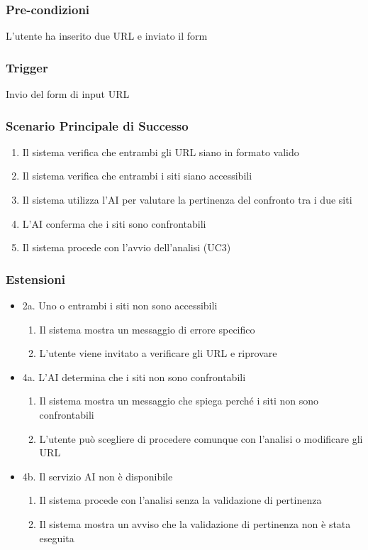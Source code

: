 \subsubsection{Pre-condizioni}
L'utente ha inserito due URL e inviato il form

\subsubsection{Trigger}
Invio del form di input URL

\subsubsection{Scenario Principale di Successo}
\begin{enumerate}
    \item Il sistema verifica che entrambi gli URL siano in formato valido
    \item Il sistema verifica che entrambi i siti siano accessibili
    \item Il sistema utilizza l'AI per valutare la pertinenza del confronto tra i due siti
    \item L'AI conferma che i siti sono confrontabili
    \item Il sistema procede con l'avvio dell'analisi (UC3)
\end{enumerate}

\subsubsection{Estensioni}
\begin{itemize}
    \item 2a. Uno o entrambi i siti non sono accessibili
    \begin{enumerate}
        \item Il sistema mostra un messaggio di errore specifico
        \item L'utente viene invitato a verificare gli URL e riprovare
    \end{enumerate}
    
    \item 4a. L'AI determina che i siti non sono confrontabili
    \begin{enumerate}
        \item Il sistema mostra un messaggio che spiega perché i siti non sono confrontabili
        \item L'utente può scegliere di procedere comunque con l'analisi o modificare gli URL
    \end{enumerate}
    
    \item 4b. Il servizio AI non è disponibile
    \begin{enumerate}
        \item Il sistema procede con l'analisi senza la validazione di pertinenza
        \item Il sistema mostra un avviso che la validazione di pertinenza non è stata eseguita
    \end{enumerate}
\end{itemize}

